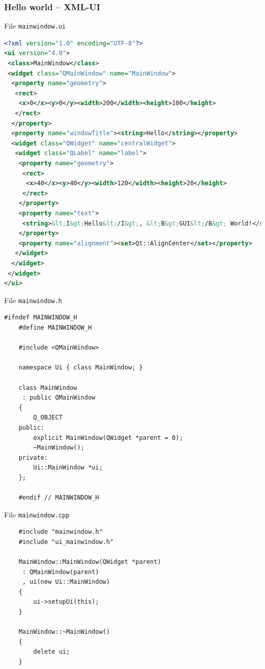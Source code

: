 \begin{frame}[fragile]
  \frametitle{Hello world -- XML-UI}
  File \texttt{mainwindow.ui}

\begin{lstlisting}[basicstyle=\tiny\ttfamily,language=XML]
<?xml version="1.0" encoding="UTF-8"?>
<ui version="4.0">
 <class>MainWindow</class>
 <widget class="QMainWindow" name="MainWindow">
  <property name="geometry">
   <rect>
    <x>0</x><y>0</y><width>200</width><height>100</height>
   </rect>
  </property>
  <property name="windowTitle"><string>Hello</string></property>
  <widget class="QWidget" name="centralWidget">
   <widget class="QLabel" name="label">
    <property name="geometry">
     <rect>
      <x>40</x><y>40</y><width>120</width><height>20</height>
     </rect>
    </property>
    <property name="text">
     <string>&lt;I&gt;Hello&lt;/I&gt;, &lt;B&gt;GUI&lt;/B&gt; World!</string>
    </property>
    <property name="alignment"><set>Qt::AlignCenter</set></property>
   </widget>
  </widget>
 </widget>
</ui>
\end{lstlisting}
\end{frame}

\begin{frame}[fragile]
  File \texttt{mainwindow.h}

  \begin{lstlisting}[basicstyle=\scriptsize\ttfamily]
	#ifndef MAINWINDOW_H
	#define MAINWINDOW_H

	#include <QMainWindow>

	namespace Ui { class MainWindow; }

	class MainWindow
 	 : public QMainWindow
	{
	    Q_OBJECT
	public:
	    explicit MainWindow(QWidget *parent = 0);
	    ~MainWindow();
	private:
	    Ui::MainWindow *ui;
	};

	#endif // MAINWINDOW_H
  \end{lstlisting}
\end{frame}


\begin{frame}[fragile]
  File \texttt{mainwindow.cpp}

  \begin{lstlisting}
	#include "mainwindow.h"
	#include "ui_mainwindow.h"

	MainWindow::MainWindow(QWidget *parent)
 	 : QMainWindow(parent)
 	 , ui(new Ui::MainWindow)
	{
	    ui->setupUi(this);
	}

	MainWindow::~MainWindow()
	{
	    delete ui;
	}
  \end{lstlisting}
\end{frame}


